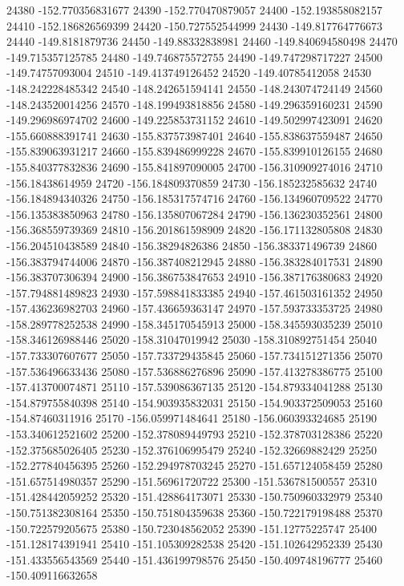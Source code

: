 {24380 -152.770356831677
24390 -152.770470879057
24400 -152.193858082157
24410 -152.186826569399
24420 -150.727552544999
24430 -149.817764776673
24440 -149.8181879736
24450 -149.88332838981
24460 -149.840694580498
24470 -149.715357125785
24480 -149.746875572755
24490 -149.747298717227
24500 -149.74757093004
24510 -149.413749126452
24520 -149.40785412058
24530 -148.242228485342
24540 -148.242651594141
24550 -148.243074724149
24560 -148.243520014256
24570 -148.199493818856
24580 -149.296359160231
24590 -149.296986974702
24600 -149.225853731152
24610 -149.502997423091
24620 -155.660888391741
24630 -155.837573987401
24640 -155.838637559487
24650 -155.839063931217
24660 -155.839486999228
24670 -155.839910126155
24680 -155.840377832836
24690 -155.841897090005
24700 -156.310909274016
24710 -156.18438614959
24720 -156.184809370859
24730 -156.185232585632
24740 -156.184894340326
24750 -156.185317574716
24760 -156.134960709522
24770 -156.135383850963
24780 -156.135807067284
24790 -156.136230352561
24800 -156.368559739369
24810 -156.201861598909
24820 -156.171132805808
24830 -156.204510438589
24840 -156.38294826386
24850 -156.383371496739
24860 -156.383794744006
24870 -156.387408212945
24880 -156.383284017531
24890 -156.383707306394
24900 -156.386753847653
24910 -156.387176380683
24920 -157.794881489823
24930 -157.598841833385
24940 -157.461503161352
24950 -157.436236982703
24960 -157.436659363147
24970 -157.593733353725
24980 -158.289778252538
24990 -158.345170545913
25000 -158.345593035239
25010 -158.346126988446
25020 -158.31047019942
25030 -158.310892751454
25040 -157.733307607677
25050 -157.733729435845
25060 -157.734151271356
25070 -157.536496633436
25080 -157.536886276896
25090 -157.413278386775
25100 -157.413700074871
25110 -157.539086367135
25120 -154.879334041288
25130 -154.879755840398
25140 -154.903935832031
25150 -154.903372509053
25160 -154.87460311916
25170 -156.059971484641
25180 -156.060393324685
25190 -153.340612521602
25200 -152.378089449793
25210 -152.378703128386
25220 -152.375685026405
25230 -152.376106995479
25240 -152.32669882429
25250 -152.277840456395
25260 -152.294978703245
25270 -151.657124058459
25280 -151.657514980357
25290 -151.56961720722
25300 -151.536781500557
25310 -151.428442059252
25320 -151.428864173071
25330 -150.750960332979
25340 -150.751382308164
25350 -150.751804359638
25360 -150.722179198488
25370 -150.722579205675
25380 -150.723048562052
25390 -151.12775225747
25400 -151.128174391941
25410 -151.105309282538
25420 -151.102642952339
25430 -151.433556543569
25440 -151.436199798576
25450 -150.409748196777
25460 -150.409116632658
}
